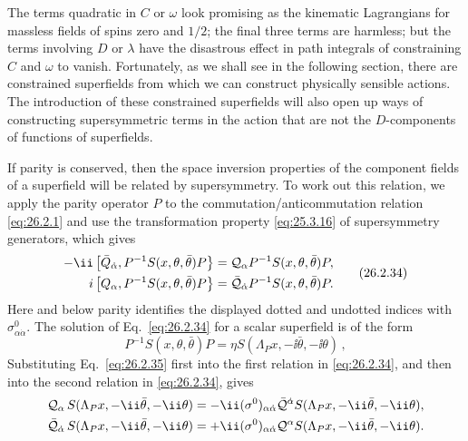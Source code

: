 The terms quadratic in $C$ or $\omega$ look promising as the kinematic
Lagrangians for massless fields of spins zero and $1/2$; the final three terms
are harmless; but the terms involving $D$ or $\lambda$ have the disastrous
effect in path integrals of constraining $C$ and $\omega$ to vanish.
Fortunately, as we shall see in the following section, there are constrained
superfields from which we can construct physically sensible actions. The
introduction of these constrained superfields will also open up ways of
constructing supersymmetric terms in the action that are not the
$D$-components of functions of superfields.

If parity is conserved, then the space inversion properties of the component
fields of a superfield will be related by supersymmetry. To work out this
relation, we apply the parity operator $P$ to the commutation/anticommutation
relation \eqref{eq:26.2.1} and use the transformation property
\eqref{eq:25.3.16} of supersymmetry generators, which gives
\begin{equation}
  \begin{aligned}
  -\ii\gradedbracket{\bar Q_{\dot\alpha}}
    {P^{-1}S(x,\theta,\bar\theta)P}
    &=\SuperQ_\alpha P^{-1}S(x,\theta,\bar\theta)P,\\
  i\gradedbracket{Q_\alpha}
    {P^{-1}S(x,\theta,\bar\theta)P}
    &=\bar{\SuperQ}_{\dot\alpha}
      P^{-1}S(x,\theta,\bar\theta)P .
  \end{aligned}
  \tag{26.2.34}\label{eq:26.2.34}
\end{equation}
Here and below parity identifies the displayed dotted and undotted indices
with \(\sigma^0_{\alpha\dot\alpha}\).
The solution of Eq.~\eqref{eq:26.2.34} for a scalar superfield is of the form
\begin{equation}
  P^{-1}S(x,\theta,\bar\theta)P
  =\eta S(\Lambda_Px,-\ii\bar\theta,-\ii\theta)\,,
  \tag{26.2.35}\label{eq:26.2.35}
\end{equation}
Substituting Eq.~\eqref{eq:26.2.35} first into the first relation in
\eqref{eq:26.2.34}, and then into the second relation in
\eqref{eq:26.2.34}, gives
\[
  \begin{aligned}
  \SuperQ_\alpha\,
   S(\Lambda_Px,-\ii\bar\theta,-\ii\theta)
  &=-\ii(\sigma^0)_{\alpha\dot\alpha}
    \bar{\SuperQ}^{\dot\alpha}
    S(\Lambda_Px,-\ii\bar\theta,-\ii\theta),\\
  \bar{\SuperQ}_{\dot\alpha}\,
   S(\Lambda_Px,-\ii\bar\theta,-\ii\theta)
  &=+\ii(\sigma^0)_{\alpha\dot\alpha}
    \SuperQ^\alpha
    S(\Lambda_Px,-\ii\bar\theta,-\ii\theta).
  \end{aligned}
\]
